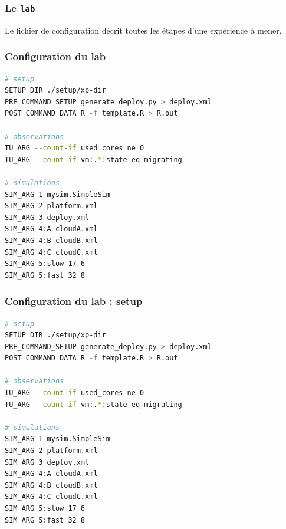 \documentclass{beamer}
\newcommand{\lab}{\texttt{lab}}
\begin{document}
\begin{frame}
	\frametitle{Le \lab}
	\resizebox{\textwidth}{!}{}
	Le fichier de configuration décrit toutes les étapes d'une expérience à
	mener.
\end{frame}

\begin{frame}[fragile]
	\frametitle{Configuration du lab}
\begin{lstlisting}[language=bash,basicstyle=\tt\footnotesize,backgroundcolor=\color{gray!10},
morekeywords={SETUP_DIR,TU_ARG,PRE_COMMAND_SETUP,POST_COMMAND_DATA,SIM_ARG},
keywordstyle=\color{red!90},commentstyle=\color{blue!70}]
# setup
SETUP_DIR ./setup/xp-dir
PRE_COMMAND_SETUP generate_deploy.py > deploy.xml
POST_COMMAND_DATA R -f template.R > R.out

# observations
TU_ARG --count-if used_cores ne 0
TU_ARG --count-if vm:.*:state eq migrating

# simulations
SIM_ARG 1 mysim.SimpleSim
SIM_ARG 2 platform.xml 
SIM_ARG 3 deploy.xml
SIM_ARG 4:A cloudA.xml
SIM_ARG 4:B cloudB.xml 
SIM_ARG 4:C cloudC.xml
SIM_ARG 5:slow 17 6
SIM_ARG 5:fast 32 8
\end{lstlisting}
\end{frame}

\begin{frame}[fragile]
	\frametitle{Configuration du lab : setup}
\begin{lstlisting}[language=bash,basicstyle=\tt\footnotesize,
morekeywords={SETUP_DIR,TU_ARG,PRE_COMMAND_SETUP,POST_COMMAND_DATA,SIM_ARG},
keywordstyle=\color{red!90},commentstyle=\color{blue!70},
linebackgroundcolor={\ifnum\value{lstnumber}<5\color{green!50}\else\color{gray!10}\fi}
]
# setup
SETUP_DIR ./setup/xp-dir
PRE_COMMAND_SETUP generate_deploy.py > deploy.xml
POST_COMMAND_DATA R -f template.R > R.out

# observations
TU_ARG --count-if used_cores ne 0
TU_ARG --count-if vm:.*:state eq migrating

# simulations
SIM_ARG 1 mysim.SimpleSim
SIM_ARG 2 platform.xml 
SIM_ARG 3 deploy.xml
SIM_ARG 4:A cloudA.xml
SIM_ARG 4:B cloudB.xml 
SIM_ARG 4:C cloudC.xml
SIM_ARG 5:slow 17 6
SIM_ARG 5:fast 32 8
\end{lstlisting}
\end{frame}
\end{document}
